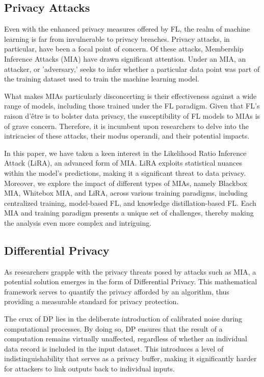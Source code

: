 \subsection{Privacy Attacks}

Even with the enhanced privacy measures offered by FL, the realm of machine learning is far from invulnerable to privacy breaches. Privacy attacks, in particular, have been a focal point of concern. Of these attacks, Membership Inference Attacks (MIA) have drawn significant attention. Under an MIA, an attacker, or 'adversary,' seeks to infer whether a particular data point was part of the training dataset used to train the machine learning model.

What makes MIAs particularly disconcerting is their effectiveness against a wide range of models, including those trained under the FL paradigm. Given that FL’s raison d'être is to bolster data privacy, the susceptibility of FL models to MIAs is of grave concern. Therefore, it is incumbent upon researchers to delve into the intricacies of these attacks, their modus operandi, and their potential impacts.

In this paper, we have taken a keen interest in the Likelihood Ratio Inference Attack (LiRA), an advanced form of MIA. LiRA exploits statistical nuances within the model's predictions, making it a significant threat to data privacy. Moreover, we explore the impact of different types of MIAs, namely Blackbox MIA, Whitebox MIA, and LiRA, across various training paradigms, including centralized training, model-based FL, and knowledge distillation-based FL. Each MIA and training paradigm presents a unique set of challenges, thereby making the analysis even more complex and intriguing.

\subsection{Differential Privacy}

As researchers grapple with the privacy threats posed by attacks such as MIA, a potential solution emerges in the form of Differential Privacy. This mathematical framework serves to quantify the privacy afforded by an algorithm, thus providing a measurable standard for privacy protection.

The crux of DP lies in the deliberate introduction of calibrated noise during computational processes. By doing so, DP ensures that the result of a computation remains virtually unaffected, regardless of whether an individual data record is included in the input dataset. This introduces a level of indistinguishability that serves as a privacy buffer, making it significantly harder for attackers to link outputs back to individual inputs.

